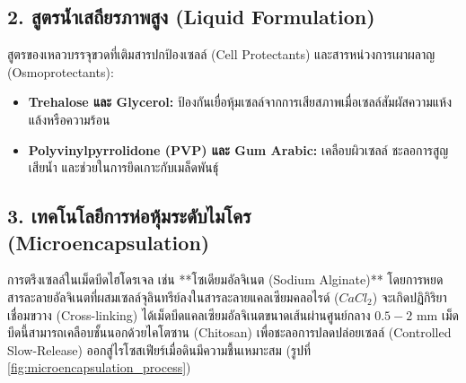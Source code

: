 \subsection{2. สูตรน้ำเสถียรภาพสูง (Liquid Formulation)}
สูตรของเหลวบรรจุขวดที่เติมสารปกป้องเซลล์ (Cell Protectants) และสารหน่วงการเผาผลาญ (Osmoprotectants):
\begin{itemize}
    \item \textbf{Trehalose และ Glycerol:} ป้องกันเยื่อหุ้มเซลล์จากการเสียสภาพเมื่อเซลล์สัมผัสความแห้งแล้งหรือความร้อน
    \item \textbf{Polyvinylpyrrolidone (PVP) และ Gum Arabic:} เคลือบผิวเซลล์ ชะลอการสูญเสียน้ำ และช่วยในการยึดเกาะกับเมล็ดพันธุ์
\end{itemize}

\subsection{3. เทคโนโลยีการห่อหุ้มระดับไมโคร (Microencapsulation)}
การตรึงเซลล์ในเม็ดบีดไฮโดรเจล เช่น **โซเดียมอัลจิเนต (Sodium Alginate)** โดยการหยดสารละลายอัลจิเนตที่ผสมเซลล์จุลินทรีย์ลงในสารละลายแคลเซียมคลอไรด์ ($CaCl_2$) จะเกิดปฏิกิริยาเชื่อมขวาง (Cross-linking) ได้เม็ดบีดแคลเซียมอัลจิเนตขนาดเส้นผ่านศูนย์กลาง $0.5 - 2\text{ mm}$ เม็ดบีดนี้สามารถเคลือบชั้นนอกด้วยไคโตซาน (Chitosan) เพื่อชะลอการปลดปล่อยเซลล์ (Controlled Slow-Release) ออกสู่ไรโซสเฟียร์เมื่อดินมีความชื้นเหมาะสม (รูปที่ \ref{fig:microencapsulation_process})

